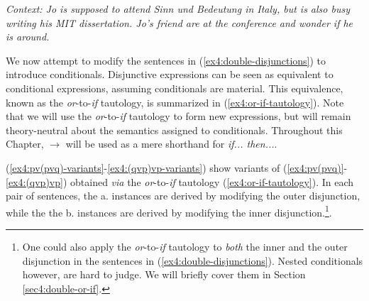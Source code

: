 \begin{exe}
	\ex \textit{Context: Jo is supposed to attend Sinn und Bedeutung in Italy, but is also busy writing his MIT dissertation. Jo's friend are at the conference and wonder if he is around.}\label{ex4:double-disjunctions}
	\begin{xlist}
		\label{ex4:pv(pvq)}
		\label{ex4:pv(qvp)}
		\label{ex4:(pvq)vp}
		\label{ex4:(qvp)vp}
	\end{xlist}
\end{exe} 

We now attempt to modify the sentences in (\ref{ex4:double-disjunctions}) to introduce conditionals. Disjunctive expressions can be seen as equivalent to conditional expressions, assuming conditionals are material. This equivalence, known as the \textit{or}-to-\textit{if} tautology, is summarized in (\ref{ex4:or-if-tautology}). Note that we will use the \textit{or}-to-\textit{if} tautology to form new expressions, but will remain theory-neutral about the semantics assigned to conditionals. Throughout this Chapter, $\rightarrow$ will be used as a mere shorthand for \textit{if... then...}.

\begin{exe}
	\label{ex4:or-if-tautology}
\end{exe}

(\ref{ex4:pv(pvq)-variants}-\ref{ex4:(qvp)vp-variants}) show variants of (\ref{ex4:pv(pvq)}-\ref{ex4:(qvp)vp}) obtained \textit{via} the \textit{or}-to-\textit{if} tautology (\ref{ex4:or-if-tautology}). In each pair of sentences, the a. instances are derived by modifying the outer disjunction, while the the b. instances are derived by modifying the inner disjunction.\footnote{One could also apply the \textit{or}-to-\textit{if} tautology to \textit{both} the inner and the outer disjunction in the sentences in (\ref{ex4:double-disjunctions}). Nested conditionals however, are hard to judge. We will briefly cover them in Section \ref{sec4:double-or-if}.}. 


